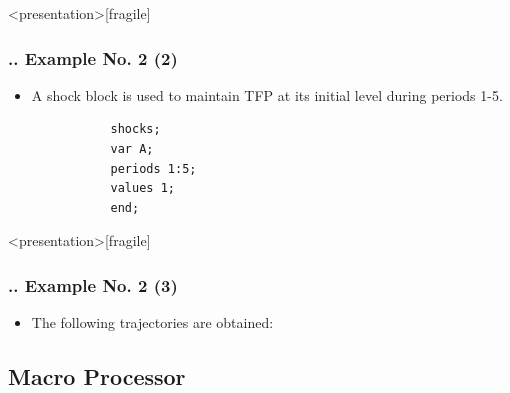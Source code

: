 \documentclass[11pt,aspectratio=169]{beamer}
\begin{document}
\begin{frame}<presentation>[fragile]
	\frametitle{{\thesection.\thesubsection.\thesubsubsection} Example No. 2 (2)}
	\begin{itemize}
		\item A shock block is used to maintain TFP at its initial level during periods 1-5.
		\begin{verbatim}
		   shocks;
		   var A;
		   periods 1:5;
		   values 1;
		   end;
		\end{verbatim}
	\end{itemize}
\end{frame}
\begin{frame}<presentation>[fragile]
	\frametitle{{\thesection.\thesubsection.\thesubsubsection} Example No. 2 (3)}
	\begin{itemize}
		\item The following trajectories are obtained:
		\begin{figure}
			\centering
			\qquad
			\qquad
		\end{figure}
	\end{itemize}
\end{frame}

\subsection{Macro Processor}
\end{document}
